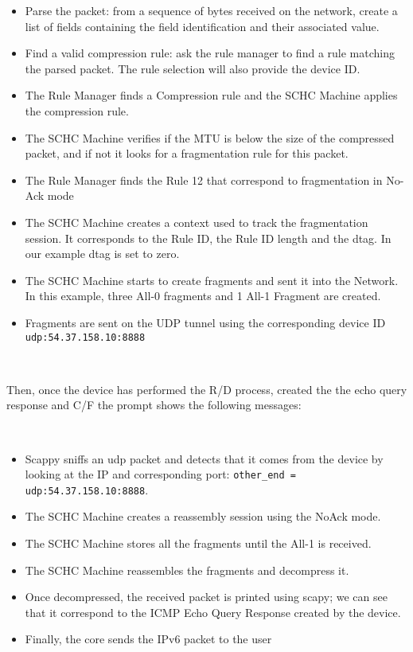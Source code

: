 \begin{itemize}

\item Parse the packet: from a sequence of bytes received on the network, create a list of fields containing the field identification and their associated value.
\item Find a valid compression rule: ask the rule manager to find a rule matching the
parsed packet. 
The rule selection will also provide the device ID.
\item The Rule Manager finds a Compression rule and the SCHC Machine applies the compression rule.
\item The SCHC Machine verifies if the MTU is below the size of the compressed packet, and if not it looks for a fragmentation rule for this packet. 
\item The Rule Manager finds the Rule 12 that correspond to fragmentation in No-Ack mode
\item The SCHC Machine creates a context used to track the fragmentation session. It corresponds to the Rule ID, the Rule ID length and the dtag. In our example dtag is set to zero.
\item The SCHC Machine starts to create fragments and sent it into the Network. 
In this example, three All-0 fragments and 1 All-1 Fragment are created.
\item Fragments are sent on the UDP tunnel using the corresponding device ID 
\\
\texttt{udp:54.37.158.10:8888}
\end{itemize}

~

Then, once the device has performed the R/D process, created the the echo query response and C/F the prompt shows the following messages:

~

\begin{itemize}
\item Scappy sniffs an udp packet and detects that it comes from the device by looking at the IP and corresponding port: \texttt{other\_end = udp:54.37.158.10:8888}.
\item The SCHC Machine creates a reassembly session using the NoAck mode.
\item The SCHC Machine stores all the fragments until the All-1 is received.
\item The SCHC Machine reassembles the fragments and decompress it.
\item Once decompressed, the received packet is printed using scapy; we can see that it correspond to the ICMP Echo Query Response created by the device.
\item Finally, the core sends the IPv6 packet to the user  
\end{itemize}


